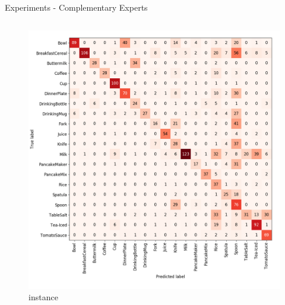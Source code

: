 \documentclass[]{beamer}
\begin{document}
\begin{frame}{Experiments - Complementary Experts}
\begin{columns}
\begin{column}{0.5\textwidth}
\begin{figure}
			\includegraphics[scale=.2]{../thesis/img/chapter6/UnrealGTClass_instance.png}
			\caption{instance}
		\end{figure}
	\end{column}
\end{columns}
\end{frame}
\end{document}
